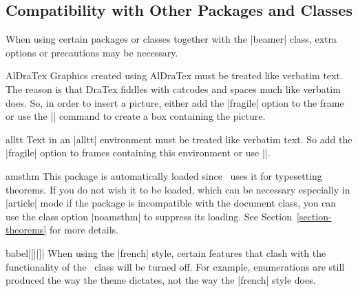 %
%
%

\subsection{Compatibility with Other Packages and Classes}

When using certain packages or classes together with the |beamer| class, extra options or precautions may be necessary.

\begin{package}{{AlDraTex}}
  Graphics created using AlDraTex must be treated like verbatim text. The reason is that DraTex fiddles with catcodes and spaces much like verbatim does. So, in order to insert a picture, either add the |fragile| option to the frame or use the || command to create a box containing the picture.
\end{package}

\begin{package}{{alltt}}
  Text in an |alltt| environment must be treated like verbatim text. So add the |fragile| option to frames containing this environment or use ||.
\end{package}

\begin{package}{{amsthm}}
  This package is automatically loaded since \beamer\ uses it for typesetting theorems. If you do not wish it to be loaded, which can be necessary especially in |article| mode if the package is incompatible with the document class, you can use the class option |noamsthm| to suppress its loading. See Section~\ref{section-theorems} for more details.
\end{package}

\begin{package}{{babel}|[||]|}
  When using the |french| style, certain features that clash with the functionality of the \beamer\ class will be turned off. For example, enumerations are still produced the way the theme dictates, not the way the |french| style does.
\end{package}

